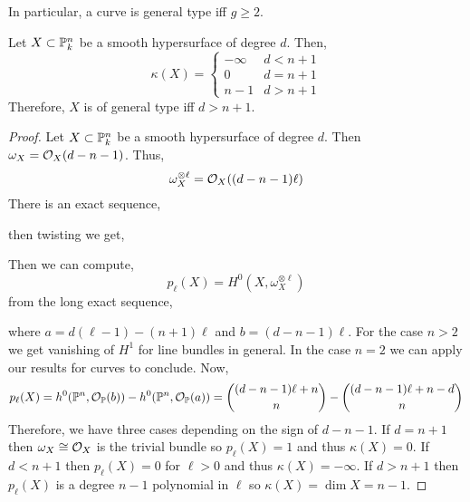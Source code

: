 \documentclass[12pt]{article}
\begin{document}
\begin{rmk}
In particular, a curve is general type iff $g \ge 2$. 
\end{rmk}

\begin{prop}
Let $X \subset \P^n_k$ be a smooth hypersurface of degree $d$. Then,
\[ \kappa(X) =
\begin{cases}
-\infty & d < n + 1
\\
0 & d = n + 1
\\
n - 1 & d > n + 1
\end{cases} \]
Therefore, $X$ is of general type iff $d > n + 1$. 
\end{prop}

\begin{proof}
Let $X \subset \P^n_k$ be a smooth hypersurface of degree $d$. Then $\omega_X = \struct{X}(d - n - 1)$. Thus,
\[ \omega_X^{\otimes \ell} = \struct{X}((d - n - 1) \ell)  \]
There is an exact sequence,
\begin{center}
\end{center}
then twisting we get,
\begin{center}
\end{center}
Then we can compute,
\[ p_\ell(X) = H^0(X, \omega_X^{\otimes \ell})  \]
from the long exact sequence,
\begin{center}
\end{center}
where $a = d(\ell - 1) - (n + 1)\ell$ and $b = (d - n - 1) \ell$. For the case $n > 2$ we get vanishing of $H^1$ for line bundles in general. In the case $n = 2$ we can apply our results for curves to conclude. Now,
\[ p_\ell(X) = h^0(\P^n, \struct{\P}(b)) - h^0(\P^n, \struct{\P}(a)) = { (d - n - 1) \ell + n  \choose n } - { (d - n - 1) \ell + n - d \choose n } \]
Therefore, we have three cases depending on the sign of $d - n - 1$. If $d = n + 1$ then $\omega_X \cong \struct{X}$ is the trivial bundle so $p_\ell(X) = 1$ and thus $\kappa(X) = 0$. If $d < n + 1$ then $p_\ell(X) = 0$ for $\ell > 0$ and thus $\kappa(X) = - \infty$. If $d > n + 1$ then $p_\ell(X)$ is a degree $n-1$ polynomial in $\ell$ so $\kappa(X) = \dim{X} = n - 1$.
\end{proof}
\end{document}
